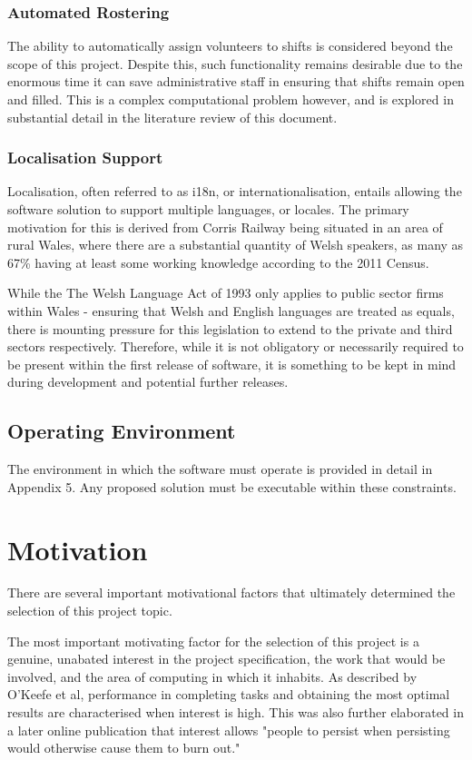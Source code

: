 \subsubsection{Automated Rostering}
The ability to automatically assign volunteers to shifts is considered beyond the scope of this project. Despite this, such functionality remains desirable due to the enormous time it can save administrative staff in ensuring that shifts remain open and filled. This is a complex computational problem however, and is explored in substantial detail in the literature review of this document.

\subsubsection{Localisation Support}
Localisation, often referred to as i18n, or internationalisation, entails allowing the software solution to support multiple languages, or locales. The primary motivation for this is derived from Corris Railway being situated in an area of rural Wales, where there are a substantial quantity of Welsh speakers, as many as 67\% having at least some working knowledge according to the 2011 Census. \cite{Census1}

While the The Welsh Language Act of 1993 only applies to public sector firms within Wales - ensuring that Welsh and English languages are treated as equals, there is mounting pressure for this legislation to extend to the private and third sectors respectively. Therefore, while it is not obligatory or necessarily required to be present within the first release of software, it is something to be kept in mind during development and potential further releases. \cite{Senedd1} \cite{BBC1}

\subsection{Operating Environment}
The environment in which the software must operate is provided in detail in Appendix 5. Any proposed solution must be executable within these constraints.

\section{Motivation}
There are several important motivational factors that ultimately determined the selection of this project topic.

The most important motivating factor for the selection of this project is a genuine, unabated interest in the project specification, the work that would be involved, and the area of computing in which it inhabits. As described by O'Keefe et al, performance in completing tasks and obtaining the most optimal results are characterised when interest is high. \cite{OKEEFE201470} This was also further elaborated in a later online publication that interest allows "people to persist when persisting would otherwise cause them to burn out." \cite{OKEEFE2014WEB}


